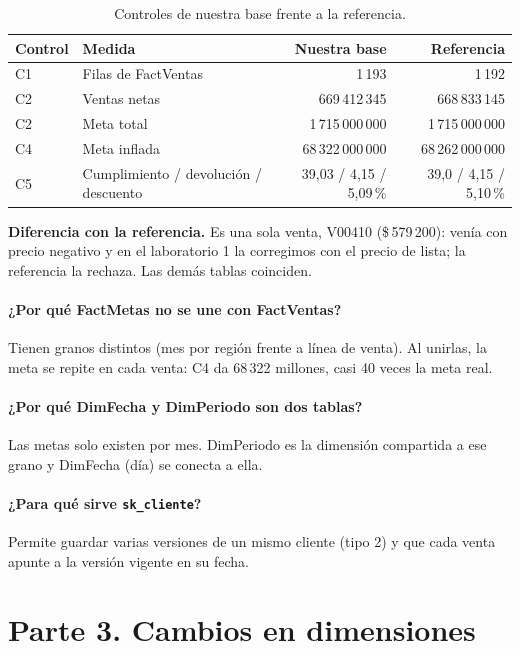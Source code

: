 \documentclass[11pt,letterpaper]{article}
\newcommand{\cop}[1]{\$\,#1}
\begin{document}
\begin{table}[!ht]
\centering\small
\caption{Controles de nuestra base frente a la referencia.}
\begin{tabular}{llrr}
\toprule
Control & Medida & Nuestra base & Referencia \\
\midrule
C1 & Filas de FactVentas & 1\,193 & 1\,192 \\
C2 & Ventas netas & 669\,412\,345 & 668\,833\,145 \\
C2 & Meta total & 1\,715\,000\,000 & 1\,715\,000\,000 \\
C4 & Meta inflada & 68\,322\,000\,000 & 68\,262\,000\,000 \\
C5 & Cumplimiento / devolución / descuento & 39,03 / 4,15 / 5,09\,\% & 39,0 / 4,15 / 5,10\,\% \\
\bottomrule
\end{tabular}
\end{table}

\textbf{Diferencia con la referencia.} Es una sola venta, V00410 (\cop{579\,200}): venía con precio negativo y en el
laboratorio 1 la corregimos con el precio de lista; la referencia la rechaza. Las demás tablas coinciden.

\paragraph{¿Por qué FactMetas no se une con FactVentas?} Tienen granos distintos (mes por región frente a línea de
venta). Al unirlas, la meta se repite en cada venta: C4 da 68\,322 millones, casi 40 veces la meta real.

\paragraph{¿Por qué DimFecha y DimPeriodo son dos tablas?} Las metas solo existen por mes. DimPeriodo es la
dimensión compartida a ese grano y DimFecha (día) se conecta a ella.

\paragraph{¿Para qué sirve \texttt{sk\_cliente}?} Permite guardar varias versiones de un mismo cliente (tipo 2) y
que cada venta apunte a la versión vigente en su fecha.

\section{Parte 3. Cambios en dimensiones}
\end{document}
